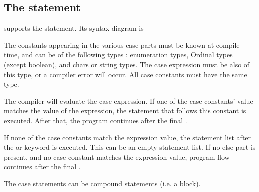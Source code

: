 \subsection{The  statement}
\fpc supports the  statement. Its syntax diagram is

The constants appearing in the various case parts must be known at
compile-time, and can be of the following types : enumeration types,
Ordinal types (except boolean), and chars or string types. 
The case expression must be also of this type, or a compiler error 
will occur. All case constants must have the same type.

The compiler will evaluate the case expression. If one of the case
constants' value matches the value of the expression, the statement that follows
this constant is executed. After that, the program continues after the final
.  

If none of the case constants match the expression value, the statement
list after the   or  
keyword is executed. This can be an empty statement list.
If no else part is present, and no case constant matches the expression
value, program flow continues after the final .

The case statements can be compound statements (i.e. a  block).

